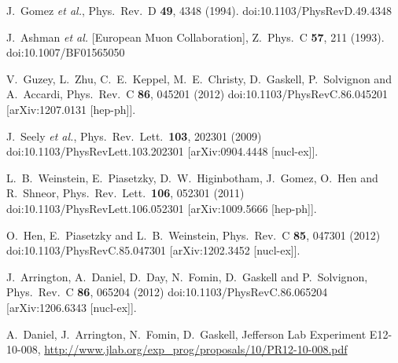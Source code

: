 \documentclass[twocolumn]{revtex4}
\begin{document}
\begin{thebibliography}{25}
  
  J.~Gomez {\it et al.},
  Phys.\ Rev.\ D {\bf 49}, 4348 (1994).
  doi:10.1103/PhysRevD.49.4348

  J.~Ashman {\it et al.} [European Muon Collaboration],
  Z.\ Phys.\ C {\bf 57}, 211 (1993).
  doi:10.1007/BF01565050

  V.~Guzey, L.~Zhu, C.~E.~Keppel, M.~E.~Christy, D.~Gaskell, P.~Solvignon and A.~Accardi,
  Phys.\ Rev.\ C {\bf 86}, 045201 (2012)
  doi:10.1103/PhysRevC.86.045201
  [arXiv:1207.0131 [hep-ph]].
  
  J.~Seely {\it et al.},
  Phys.\ Rev.\ Lett.\  {\bf 103}, 202301 (2009)
  doi:10.1103/PhysRevLett.103.202301
  [arXiv:0904.4448 [nucl-ex]].
  
  L.~B.~Weinstein, E.~Piasetzky, D.~W.~Higinbotham, J.~Gomez, O.~Hen and R.~Shneor,
  Phys.\ Rev.\ Lett.\  {\bf 106}, 052301 (2011)
  doi:10.1103/PhysRevLett.106.052301
  [arXiv:1009.5666 [hep-ph]].
  
  O.~Hen, E.~Piasetzky and L.~B.~Weinstein,
  Phys.\ Rev.\ C {\bf 85}, 047301 (2012)
  doi:10.1103/PhysRevC.85.047301
  [arXiv:1202.3452 [nucl-ex]].
  
  J.~Arrington, A.~Daniel, D.~Day, N.~Fomin, D.~Gaskell and P.~Solvignon,
  Phys.\ Rev.\ C {\bf 86}, 065204 (2012)
  doi:10.1103/PhysRevC.86.065204
  [arXiv:1206.6343 [nucl-ex]].

  A.~Daniel, J.~Arrington, N.~Fomin, D.~Gaskell, Jefferson Lab Experiment E12-10-008,
  \url{http://www.jlab.org/exp_prog/proposals/10/PR12-10-008.pdf}


\end{thebibliography}
\end{document}
